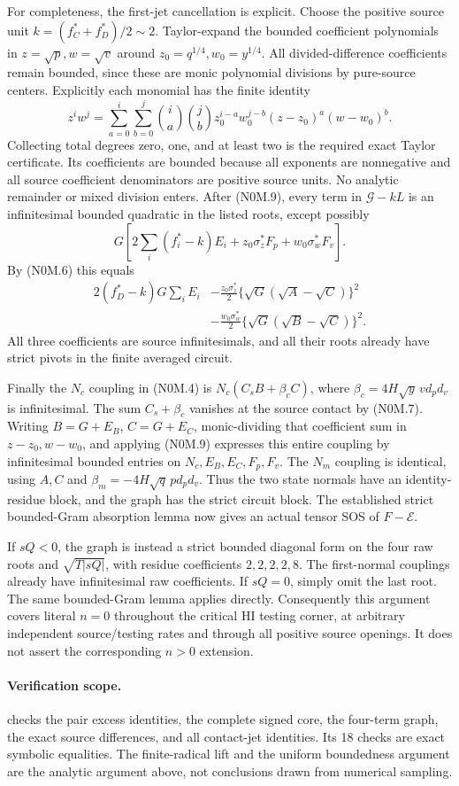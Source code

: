 For completeness, the first-jet cancellation is explicit. Choose the
positive source unit $k=(f_C^*+f_D^*)/2\sim2$. Taylor-expand the bounded
coefficient polynomials in $z=\sqrt p,w=\sqrt v$ around
$z_0=q^{1/4},w_0=y^{1/4}$. All divided-difference coefficients remain
bounded, since these are monic polynomial divisions by pure-source
centers. Explicitly each monomial has the finite identity
\[
 z^iw^j=\sum_{a=0}^i\sum_{b=0}^j
 {i\choose a}{j\choose b}z_0^{i-a}w_0^{j-b}
 (z-z_0)^a(w-w_0)^b.
\]
Collecting total degrees zero, one, and at least two is the required
exact Taylor certificate. Its coefficients are bounded because all
exponents are nonnegative and all source coefficient denominators are
positive source units. No analytic remainder or mixed division enters.
After (N0M.9), every term in $\mathcal G-kL$ is an infinitesimal
bounded quadratic in the listed roots, except possibly
\[
 G\left[2\sum_i(f_i^*-k)E_i
       +z_0\sigma_z^*F_p+w_0\sigma_w^*F_v\right].
\]
By (N0M.6) this equals
\begin{align*}
 2(f_D^*-k)G\sum_iE_i
 &-\frac{z_0\sigma_z^*}{2}
       \{\sqrt G(\sqrt A-\sqrt C)\}^2\\
 &-\frac{w_0\sigma_w^*}{2}
       \{\sqrt G(\sqrt B-\sqrt C)\}^2.
\end{align*}
All three coefficients are source infinitesimals, and all their roots
already have strict pivots in the finite averaged circuit.

Finally the $N_c$ coupling in (N0M.4) is
$N_c(C_sB+\beta_cC)$, where
$\beta_c=4H\sqrt y\,v d_pd_v$ is infinitesimal.
The sum $C_s+\beta_c$ vanishes at the source contact by (N0M.7).
Writing $B=G+E_B$, $C=G+E_C$, monic-dividing that coefficient sum in
$z-z_0,w-w_0$, and applying (N0M.9) expresses this entire coupling by
infinitesimal bounded entries on $N_c,E_B,E_C,F_p,F_v$. The $N_m$
coupling is identical, using $A,C$ and
$\beta_m=-4H\sqrt q\,p d_pd_v$. Thus the two state normals have an
identity-residue block, and the graph has the strict circuit block.
The established strict bounded-Gram absorption lemma now gives an
actual tensor SOS of $F-\mathcal E$.

If $sQ<0$, the graph is instead a strict bounded diagonal form on the
four raw roots and $\sqrt{T|sQ|}$, with residue coefficients
$2,2,2,2,8$. The first-normal couplings already have infinitesimal raw
coefficients. If $sQ=0$, simply omit the last root. The same bounded-Gram
lemma applies directly. Consequently this argument covers literal
$n=0$ throughout the critical HI testing corner, at arbitrary independent
source/testing rates and through all positive source openings. It does
not assert the corresponding $n>0$ extension.

\paragraph{Verification scope.}
 checks the pair excess
identities, the complete signed core, the four-term graph, the exact
source differences, and all contact-jet identities. Its 18 checks are
exact symbolic equalities. The finite-radical lift and the uniform
boundedness argument are the analytic argument above, not conclusions
drawn from numerical sampling.
